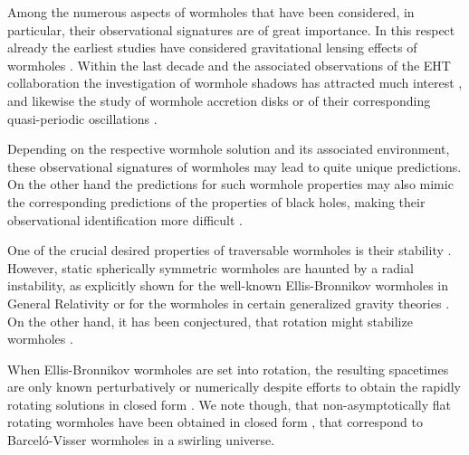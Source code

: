 \documentclass[aps,prd,12pt,superscriptaddress]{revtex4-2}
\begin{document}
Among the numerous aspects of wormholes that have been considered, in particular, their observational signatures are of great importance.
In this respect already the earliest studies have considered gravitational lensing effects of wormholes
\cite{Cramer:1994qj,Safonova:2001vz,Perlick:2003vg,Nandi:2006ds,Abe:2010ap,Toki:2011zu,Nakajima:2012pu,Tsukamoto:2012xs,Kuhfittig:2013hva,Bambi:2013nla,Takahashi:2013jqa,Tsukamoto:2016zdu}.
Within the last decade and the associated observations of the EHT collaboration \cite{EventHorizonTelescope:2019dse,EventHorizonTelescope:2022wkp}
the investigation of wormhole shadows has attracted much interest
\cite{Bambi:2013nla,Nedkova:2013msa,Ohgami:2015nra,Shaikh:2018kfv,Gyulchev:2018fmd,Guerrero:2022qkh,Huang:2023yqd},
and likewise the study of wormhole accretion disks or of their corresponding quasi-periodic oscillations
\cite{Harko:2008vy,Harko:2009xf,Bambi:2013jda,Zhou:2016koy,Lamy:2018zvj,Deligianni:2021ecz,Deligianni:2021hwt}.

Depending on the respective wormhole solution and its associated environment, these observational signatures of wormholes may lead to quite unique predictions.
On the other hand the predictions for such wormhole properties may also mimic the corresponding predictions of the properties of black holes, making their observational identification more difficult 
\cite{Damour:2007ap,Bambi:2013nla,Azreg-Ainou:2014dwa,Dzhunushaliev:2016ylj,Cardoso:2016rao,Konoplya:2016hmd,Nandi:2016uzg,Bueno:2017hyj,Blazquez-Salcedo:2018ipc,Azad:2020ajs,Azad:2022qqn}.

One of the crucial desired properties of traversable wormholes is their stability \cite{Morris:1988cz}.
However, static spherically symmetric wormholes are haunted by a radial instability, as explicitly shown for the well-known Ellis-Bronnikov wormholes in General Relativity \cite{Shinkai:2002gv,Gonzalez:2008wd,Gonzalez:2008xk,Cremona:2018wkj,Blazquez-Salcedo:2018ipc} or for the wormholes in certain generalized gravity theories \cite{Cuyubamba:2018jdl}.
On the other hand, it has been conjectured, that rotation might stabilize wormholes \cite{Matos:2005uh}.
 
When Ellis-Bronnikov wormholes are set into rotation, the resulting spacetimes are only known perturbatively \cite{Kashargin:2007mm,Kashargin:2008pk} or numerically \cite{Kleihaus:2014dla,Chew:2016epf} despite efforts to obtain the rapidly rotating solutions in closed form \cite{Volkov:2021blw}.
We note though, that non-asymptotically flat rotating wormholes have been obtained in closed form \cite{Cisterna:2023uqf}, that correspond to Barcel\'o-Visser wormholes \cite{Barcelo:2000zf} in a swirling universe.
\end{document}
